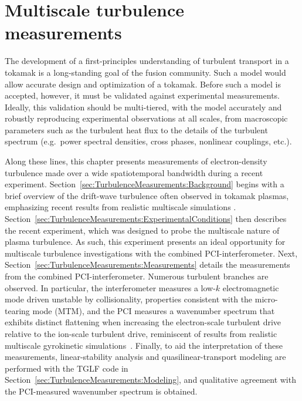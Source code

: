 \chapter{Multiscale turbulence measurements}
\label{ch:TurbulenceMeasurements}
The development of a first-principles understanding
of turbulent transport in a tokamak
is a long-standing goal of the fusion community.
Such a model would allow accurate design and optimization of a tokamak.
Before such a model is accepted, however,
it must be validated against experimental measurements.
Ideally, this validation should be multi-tiered,
with the model accurately and robustly reproducing
experimental observations at all scales,
from macroscopic parameters such as the turbulent heat flux to
the details of the turbulent spectrum
(e.g.\ power spectral densities, cross phases, nonlinear couplings, etc.).

Along these lines,
this chapter presents measurements of electron-density turbulence
made over a wide spatiotemporal bandwidth
during a recent \diiid\space experiment.
Section~\ref{sec:TurbulenceMeasurements:Background}
begins with a brief overview of the drift-wave turbulence
often observed in tokamak plasmas,
emphasizing recent results
from realistic multiscale simulations
\cite{howard_pp14, howard_nf16, howard_pp16, howard_ppcf18, holland_nf17}.
Section~\ref{sec:TurbulenceMeasurements:ExperimentalConditions}
then describes the recent \diiid\space experiment,
which was designed to probe the multiscale nature
of plasma turbulence.
As such, this experiment presents an ideal opportunity
for multiscale turbulence investigations
with the combined PCI-interferometer.
Next, Section~\ref{sec:TurbulenceMeasurements:Measurements}
details the measurements from the combined PCI-interferometer.
Numerous turbulent branches are observed.
In particular, the interferometer measures
a low-$k$ electromagnetic mode driven unstable by collisionality,
properties consistent with the micro-tearing mode (MTM), and
the PCI measures a wavenumber spectrum
that exhibits distinct flattening
when increasing the electron-scale turbulent drive
relative to the ion-scale turbulent drive,
reminiscent of results
from realistic multiscale gyrokinetic simulations~\cite{howard_pp16}.
Finally, to aid the interpretation of these measurements,
linear-stability analysis and quasilinear-transport modeling
are performed with the TGLF code
in Section~\ref{sec:TurbulenceMeasurements:Modeling}, and
qualitative agreement with the PCI-measured wavenumber spectrum
is obtained.


